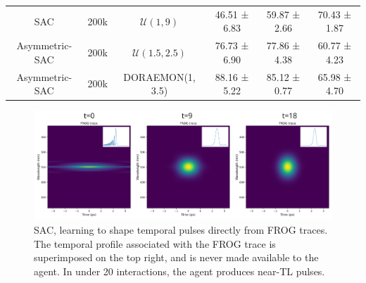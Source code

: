 \begin{table}
{\begin{tabular}{cccccc}
        \rowcolor[HTML]{EFEFEF} 
        SAC                & 200k                                                                  & \( \mathcal{U}(1, 9) \)                                                  & 46.51 ± 6.83                                                                            & 59.87 ± 2.66                                                                             & 70.43 ± 1.87                                                                             \\
        Asymmetric-SAC     & 200k                                                                  & \( \mathcal{U}(1.5, 2.5) \)                                              & 76.73 ± 6.90                                                                            & 77.86 ± 4.38                                                                             & 60.77 ± 4.23                                                                             \\
        \rowcolor[HTML]{EFEFEF} 
        Asymmetric-SAC     & 200k                                                                  & DORAEMON(1, 3.5)                                                         & 88.16 ± 5.22                                                                            & 85.12 ± 0.77                                                                             & 65.98 ± 4.70                                                                            
    \end{tabular}
    }
\end{table}


\begin{figure}
    \centering
    \includegraphics[width=\linewidth]{images/frogopt.png}
    \caption{SAC, learning to shape temporal pulses directly from FROG traces. The temporal profile associated with the FROG trace is superimposed on the top right, and is never made available to the agent. In under 20 interactions, the agent produces near-TL pulses.}
    \label{fig:frog_opt}
\end{figure}
    
